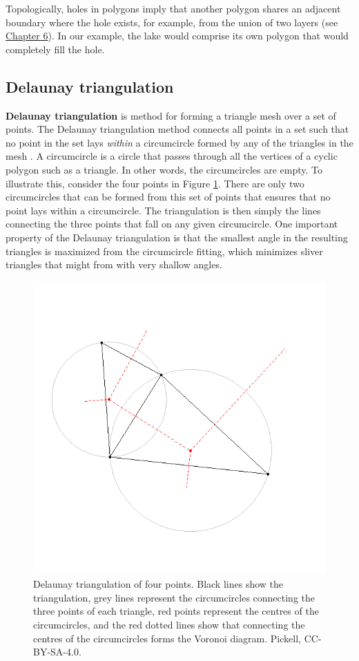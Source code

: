\documentclass[
]{book}
\begin{document}
Topologically, holes in polygons imply that another polygon shares an adjacent boundary where the hole exists, for example, from the union of two layers (see \href{https://ubc-geomatics-textbook.github.io/geomatics-textbook/overlay-and-proximity-analysis.html}{Chapter 6}). In our example, the lake would comprise its own polygon that would completely fill the hole.

\hypertarget{delaunay-triangulation}{%
\subsection{Delaunay triangulation}\label{delaunay-triangulation}}

\textbf{Delaunay triangulation} is method for forming a triangle mesh over a set of points. The Delaunay triangulation method connects all points in a set such that no point in the set lays \emph{within} a circumcircle formed by any of the triangles in the mesh \citep{delaunay_sur_1934}. A circumcircle is a circle that passes through all the vertices of a cyclic polygon such as a triangle. In other words, the circumcircles are empty. To illustrate this, consider the four points in Figure \ref{fig:7-delaunay-triangulation-circumcircles}. There are only two circumcircles that can be formed from this set of points that ensures that no point lays within a circumcircle. The triangulation is then simply the lines connecting the three points that fall on any given circumcircle. One important property of the Delaunay triangulation is that the smallest angle in the resulting triangles is maximized from the circumcircle fitting, which minimizes sliver triangles that might from with very shallow angles.

\begin{figure}
\includegraphics[width=0.75\linewidth]{images/07-delaunay-triangulation-circumcircles} \caption{Delaunay triangulation of four points. Black lines show the triangulation, grey lines represent the circumcircles connecting the three points of each triangle, red points represent the centres of the circumcircles, and the red dotted lines show that connecting the centres of the circumcircles forms the Voronoi diagram. Pickell, CC-BY-SA-4.0.}\label{fig:7-delaunay-triangulation-circumcircles}
\end{figure}
\end{document}
